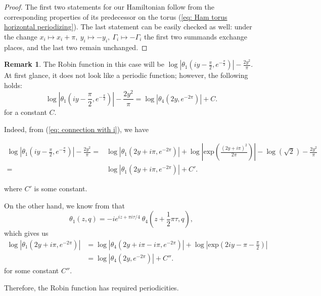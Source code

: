 \documentclass[11pt,twoside]{article}
\theoremstyle{definition}
\newtheorem{rem}[theorem]{Remark}
\numberwithin{equation}{section}
\begin{document}
\begin{proof}
The first two statements for our Hamiltonian follow from the corresponding properties of its predecessor on the torus (\ref{eq: Ham torus horizontal periodizing}). The last statement can be easily checked as well: under the change $x_i\mapsto x_i + \pi,\ y_i\mapsto-y_i,\ \Gamma_i\mapsto-\Gamma_i$ the first two summands exchange places, and the last two remain unchanged. 
\end{proof}
\begin{rem}
\label{st: Robin function Klein peiodicity}
The Robin function in this case will be  $\log\left|\theta_1\left(iy - \frac{\pi}{2}, e^{-\frac{\pi}{2}}\right)\right| - \frac{2y^2}{\pi}$. At first glance, it does not look like a periodic function; however, the following holds:
\[
\log\left|\theta_1\left(iy - \frac{\pi}{2}, e^{-\frac{\pi}{2}}\right)\right| - \frac{2y^2}{\pi} = \log\left|\theta_4\left(2y,e^{-2\pi}\right)\right| + C.
\]
for a constant $C$. 

Indeed, from (\ref{eq: connection with i}), we have
\begin{small}
\begin{equation*}
    \begin{split}
\log\left|\theta_1\left(iy-\frac{\pi}{2},e^{-\frac{\pi}{2}}\right)\right| - \frac{2y^2}{\pi} =&\log\left|\theta_1\left(2y +i\pi,e^{-2\pi} \right)\right| + \log\left|\mathrm{exp}\left(\frac{(2y + i\pi)^2}{2\pi}\right)\right| -\log(\sqrt{2}) - \frac{2y^2}{\pi}\\=&\log\left|\theta_1\left(2y + i\pi,e^{-2\pi}\right)\right| + C'.
\end{split} 
\end{equation*}
\end{small}
where $C'$ is some constant. 


On the other hand, we know from \cite{wolfram} that 
\begin{equation*}
    \label{eq: quasiperiodicity}
\theta_1\left(z,q\right) = -ie^{iz + \pi i\tau/4} \ \theta_4\left(z + \frac{1}{2}\pi\tau,q\right),
\end{equation*}
which gives us 
\begin{equation*}
    \begin{split}
        \log\left|\theta_1\left(2y + i\pi,e^{-2\pi}\right)\right| &= \log\left|\theta_4\left(2y + i\pi -i\pi,e^{-2\pi} \right)\right|+ \log\left|\mathrm{exp}\left(2iy- \pi -\frac{\pi}{2}\right)\right|   \\&=\log\left|\theta_4\left(2y,e^{-2\pi}\right)\right| + C''.
    \end{split}
\end{equation*}
for some constant $C''$.

Therefore, the Robin function has required periodicities.


\end{rem}
\end{document}
